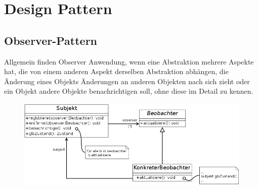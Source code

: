  \section{Design Pattern}
\subsection{Observer-Pattern}
Allgemein finden Observer Anwendung, wenn eine Abstraktion mehrere Aspekte hat, die von einem anderen Aspekt derselben Abstraktion abhängen, die Änderung eines Objekts Änderungen an anderen Objekten nach sich zieht oder ein Objekt andere Objekte benachrichtigen soll, ohne diese im Detail zu kennen.

\begin{figure}[H]
\includegraphics[width = 15cm]{mainmatter/pics/Observer.png}
\end{figure}

